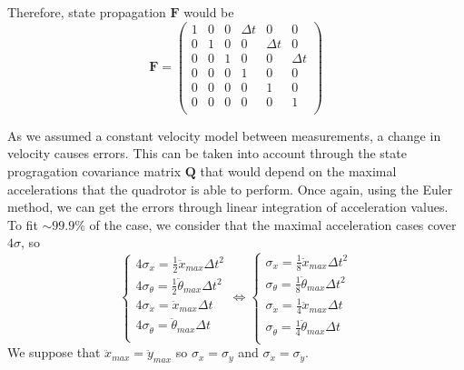 \documentclass[12pt]{article}
\begin{document}
Therefore, state propagation $\mathbf{F}$ would be
\begin{equation}
\mathbf{F} =
    \begin{pmatrix}
        1 & 0 & 0 & \Delta{t} & 0 & 0 \\
        0 & 1 & 0 & 0 & \Delta{t} & 0 \\
        0 & 0 & 1 & 0 & 0 & \Delta{t} \\
        0 & 0 & 0 & 1 & 0 & 0 \\
        0 & 0 & 0 & 0 & 1 & 0 \\
        0 & 0 & 0 & 0 & 0 & 1 \\
    \end{pmatrix}
\end{equation}

As we assumed a constant velocity model between measurements, a change in velocity causes errors.
This can be taken into account through the state progragation covariance matrix $\mathbf{Q}$ that would depend on the maximal accelerations that the quadrotor is able to perform.
Once again, using the Euler method, we can get the errors through linear integration of acceleration values.
To fit $\sim 99.9\%$ of the case, we consider that the maximal acceleration cases cover $4\sigma$, so
\begin{equation}
\left\{
    \begin{array}{l}
    4 \sigma_x = \frac{1}{2} \ddot{x}_{max} \Delta{t}^2 \\
    4 \sigma_{\theta} = \frac{1}{2} \ddot{\theta}_{max} \Delta{t}^2 \\
    4 \sigma_{\dot{x}} = \ddot{x}_{max} \Delta{t} \\
    4 \sigma_{\dot{\theta}} = \ddot{\theta}_{max} \Delta{t} \\
    \end{array}
\right.
\Leftrightarrow
\left\{
    \begin{array}{l}
    \sigma_x = \frac{1}{8} \ddot{x}_{max} \Delta{t}^2 \\
    \sigma_{\theta} = \frac{1}{8} \ddot{\theta}_{max} \Delta{t}^2 \\
    \sigma_{\dot{x}} = \frac{1}{4} \ddot{x}_{max} \Delta{t} \\
    \sigma_{\dot{\theta}} = \frac{1}{4} \ddot{\theta}_{max} \Delta{t} \\
    \end{array}
\right.
\end{equation}
We suppose that $\ddot{x}_{max} = \ddot{y}_{max}$ so $\sigma_x = \sigma_y$ and $\sigma_{\dot{x}} = \sigma_{\dot{y}}$.
\end{document}
